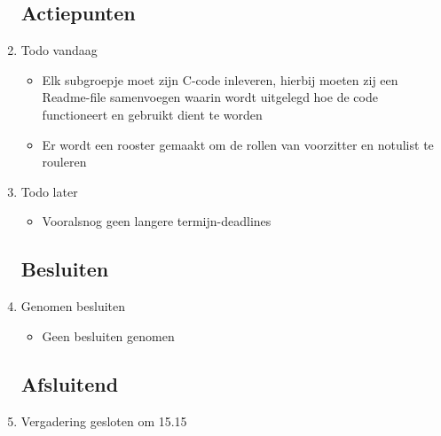 \documentclass{article}
\begin{document}
\begin{enumerate}
	\subsection*{Actiepunten}
	\item Todo vandaag
	\begin{itemize}
		\item Elk subgroepje moet zijn C-code inleveren, hierbij moeten zij een Readme-file samenvoegen waarin wordt uitgelegd hoe de code functioneert en gebruikt dient te worden
		\item Er wordt een rooster gemaakt om de rollen van voorzitter en notulist te rouleren
	\end{itemize}
	\item Todo later
	\begin{itemize}
		\item Vooralsnog geen langere termijn-deadlines
	\end{itemize}

	\subsection*{Besluiten}
	\item Genomen besluiten
	\begin{itemize}
		\item Geen besluiten genomen
	\end{itemize}

	\noindent 
	\subsection*{Afsluitend}
	\item Vergadering gesloten om 15.15%

\end{enumerate}
\end{document}
